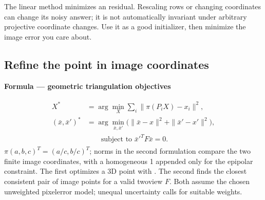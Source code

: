 \documentclass[letterpaper,11pt,english,openany,oneside]{jupyterBook}
\begin{document}
\sphinxAtStartPar
The linear method minimizes an  residual. Rescaling rows or changing coordinates can change its noisy answer; it is not automatically invariant under arbitrary projective coordinate changes. Use it as a good initializer, then minimize the image error you care about.


\subsection{Refine the point in image coordinates}
\label{\detokenize{lectures/lecture06/triangulation:refine-the-point-in-image-coordinates}}
\begin{TextbookBox}
\textbf{Formula — geometric triangulation objectives}\par\smallskip
\begin{equation}\label{equation:lectures/lecture06/triangulation:eq-lec06-geometric}
\begin{split}\begin{aligned}
X^*&=\arg\min_X\sum_i\|\pi(P_iX)-x_i\|^2,\\
(\bar x,\bar x')^*&=\arg\min_{\bar x,\bar x'}
\bigl(\|\bar x-x\|^2+\|\bar x'-x'\|^2\bigr),\\
&\hspace{2em}\text{subject to }\bar x'^TF\bar x=0.
\end{aligned}\end{split}
\end{equation}
\sphinxAtStartPar
\(\pi(a,b,c)^T=(a/c,b/c)^T\); norms in the second formulation compare the two finite image coordinates, with a homogeneous 1 appended only for the epipolar constraint. The first optimizes a 3D point with . The second finds the closest consistent pair of image points for a valid two\sphinxhyphen{}view \(F\). Both assume the chosen unweighted pixel\sphinxhyphen{}error model; unequal uncertainty calls for suitable weights.

\end{TextbookBox}
\end{document}
